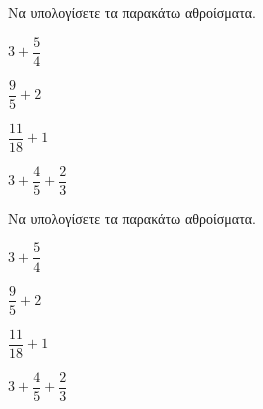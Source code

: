 Να υπολογίσετε τα παρακάτω αθροίσματα.
\begin{multicols}{2}
\begin{rlist}
\item $ 3+\dfrac{5}{4} $
\item $ \dfrac{9}{5}+2 $
\item $ \dfrac{11}{18}+1 $
\item $ 3+\dfrac{4}{5}+\dfrac{2}{3} $
\end{rlist}
\end{multicols}
Να υπολογίσετε τα παρακάτω αθροίσματα.
\begin{multicols}{2}
\begin{rlist}
\item $ 3+\dfrac{5}{4} $
\item $ \dfrac{9}{5}+2 $
\item $ \dfrac{11}{18}+1 $
\item $ 3+\dfrac{4}{5}+\dfrac{2}{3} $
\end{rlist}
\end{multicols}

